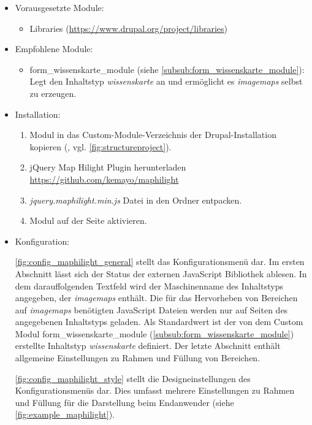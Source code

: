 \begin{itemize}[parsep=0pt, itemsep=5.0pt plus 2.0pt minus 1.0pt, leftmargin=*]
	\item Vorausgesetzte Module:

	\begin{itemize}
		\item Libraries (\url{https://www.drupal.org/project/libraries})
	\end{itemize}


	\item Empfohlene Module:

	\begin{itemize}
		\item form\_wissenskarte\_module (siehe \cref{subsub:form_wissenskarte_module}): Legt den Inhaltstyp \textit{wissenskarte} an und ermöglicht es \textit{\glspl{imagemap}} selbst zu erzeugen.
	\end{itemize}


	\item Installation:
	\begin{enumerate}
		\item Modul in das Custom-Module-Verzeichnis der Drupal-Installation kopieren  (\zB {}, vgl. \cref{fig:structureproject}).
		\item jQuery Map Hilight Plugin herunterladen \url{https://github.com/kemayo/maphilight}
		\item \textit{jquery.maphilight.min.js} Datei in den Ordner  entpacken.
		\item Modul auf der Seite  aktivieren.
	\end{enumerate}

	\item Konfiguration:

	\cref{fig:config_maphilight_general} stellt das Konfigurationsmenü dar. Im ersten Abschnitt lässt sich der Status der externen JavaScript Bibliothek ablesen. In dem darauffolgenden Textfeld wird der Maschinenname des Inhaltstyps angegeben, der \textit{\glspl{imagemap}} enthält. Die für das Hervorheben von Bereichen auf \textit{\glspl{imagemap}} benötigten JavaScript Dateien werden nur auf Seiten des angegebenen Inhaltstyps geladen. Als Standardwert ist der von dem Custom Modul form\_wissenskarte\_module (\cref{subsub:form_wissenskarte_module}) erstellte Inhaltstyp \textit{wissenskarte} definiert. Der letzte Abschnitt enthält allgemeine Einstellungen zu Rahmen und Füllung von Bereichen.

	\cref{fig:config_maphilight_style} stellt die Designeinstellungen des Konfigurationsmenüs dar. Dies umfasst mehrere Einstellungen zu Rahmen und Füllung für die Darstellung beim Endanwender (siehe \cref{fig:example_maphilight}).

\end{itemize}



